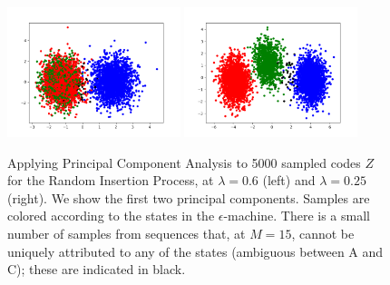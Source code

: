 \documentclass[entropy,article,submit,moreauthors,pdftex,10pt,a4paper]{Definitions/mdpi}
\begin{document}
\begin{figure}
\centering
\includegraphics[width=0.45\textwidth]{code/figures/foo_pca_2.png}
\includegraphics[width=0.45\textwidth]{code/figures/foo_pca_3.png}
	\caption{Applying Principal Component Analysis to 5000 sampled codes $Z$ for the Random Insertion Process, at $\lambda = 0.6$ (left) and $\lambda = 0.25$ (right). We show the first two principal components. Samples are colored according to the states in the $\epsilon$-machine. There is a small number of samples from sequences that, at $M=15$, cannot be uniquely attributed to any of the states (ambiguous between A and C); these are indicated in black.}\label{fig:latent}
\end{figure}
\end{document}
